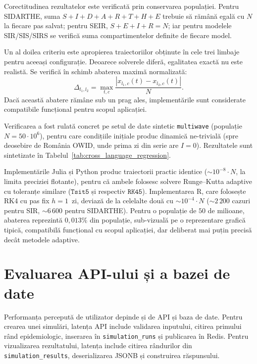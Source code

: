 Corectitudinea rezultatelor este verificată prin conservarea populației. Pentru
SIDARTHE, suma $S+I+D+A+R+T+H+E$ trebuie să rămână egală cu $N$ la fiecare pas
salvat; pentru SEIR, $S+E+I+R=N$; iar pentru modelele SIR/SIS/SIRS se verifică
suma compartimentelor definite de fiecare model.

Un al doilea criteriu este apropierea traiectoriilor obținute în cele trei
limbaje pentru aceeași configurație. Deoarece solverele diferă, egalitatea exactă
nu este realistă. Se verifică în schimb abaterea maximă normalizată:
\begin{equation}
\Delta_{l_1,l_2} =
\max_{t,c}
\frac{\left|x_{l_1,c}(t)-x_{l_2,c}(t)\right|}{N}.
\end{equation}
Dacă această abatere rămâne sub un prag ales, implementările sunt considerate
compatibile funcțional pentru scopul aplicației.

Verificarea a fost rulată concret pe setul de date sintetic
\texttt{multiwave} (populație $N = 50 \cdot 10^6$), pentru care condițiile
inițiale produc dinamică ne-trivială (spre deosebire de România OWID, unde
prima zi din serie are $I=0$). Rezultatele sunt sintetizate în
Tabelul~\ref{tab:cross_language_regression}.



Implementările Julia și Python produc traiectorii practic identice
($\sim$$10^{-8} \cdot N$, la limita preciziei flotante), pentru că
ambele folosesc solvere Runge--Kutta adaptive cu toleranțe similare
($\texttt{Tsit5}$ și respectiv $\texttt{RK45}$). Implementarea R, care
folosește RK4 cu pas fix $h = 1$~zi, deviază de la celelalte două cu
$\sim$$10^{-4} \cdot N$ ($\sim$$2\,200$ cazuri pentru SIR, $\sim$$6\,600$
pentru SIDARTHE). Pentru o populație de $50$ de milioane, abaterea
reprezintă $0{,}013\%$ din populație, sub-vizuală pe o reprezentare
grafică tipică, compatibilă funcțional cu scopul aplicației, dar
deliberat mai puțin precisă decât metodele adaptive.

\section{Evaluarea API-ului și a bazei de date}
\label{sec:evaluare_api_db}

Performanța percepută de utilizator depinde și de API și baza de date. Pentru
crearea unei simulări, latența API include validarea inputului, citirea primului
rând epidemiologic, inserarea în \texttt{simulation\_runs} și publicarea în
Redis. Pentru vizualizarea rezultatului, latența include citirea rândurilor din
\texttt{simulation\_results}, deserializarea JSONB și construirea răspunsului.

